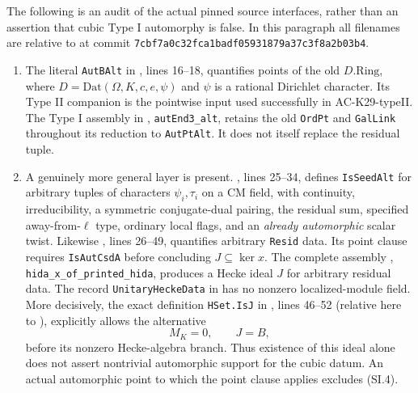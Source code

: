 \begin{remark}
\label{AC-K29-TypeI-source}
The following is an audit of the actual pinned source
interfaces, rather than an assertion that cubic Type I
automorphy is false.  In this paragraph all filenames are
relative to
at commit \texttt{7cbf7a0c32fca1badf05931879a37c3f8a2b03b4}.

\begin{enumerate}
\item The literal \texttt{AutBAlt} in
, lines 16--18,
quantifies points of the old $D.\mathrm{Ring}$, where
$D=\mathrm{Dat}(\Omega,K,c,e,\psi)$ and $\psi$ is a
rational Dirichlet character.  Its Type II companion is
the pointwise input used successfully in AC-K29-typeII.
The Type I assembly in ,
\texttt{autEnd3\_alt}, retains the old \texttt{OrdPt}
and \texttt{GalLink} throughout its reduction to
\texttt{AutPtAlt}.  It does not itself replace the residual
tuple.

\item A genuinely more general layer is present.
, lines 25--34, defines
\texttt{IsSeedAlt} for arbitrary tuples of characters
$\psi_i,\tau_i$ on a CM field, with continuity,
irreducibility, a symmetric conjugate-dual pairing,
the residual sum, specified away-from-$\ell$ type,
ordinary local flags, and an \emph{already automorphic}
scalar twist.  Likewise
, lines 26--49,
quantifies arbitrary \texttt{Resid} data.
Its point clause requires \texttt{IsAutCsdA} before
concluding $J\subseteq\ker x$.
The complete assembly
, \texttt{hida\_x\_of\_printed\_hida},
produces a Hecke ideal $J$ for arbitrary residual data.
The record \texttt{UnitaryHeckeData} in
 has no nonzero localized-module
field.  More decisively, the exact definition
\texttt{HSet.IsJ} in
, lines 46--52
(relative here to ), explicitly
allows the alternative
\[
          M_{K}=0,\qquad J=B,                             \tag{SI.4}
\]
before its nonzero Hecke-algebra branch.  Thus existence
of this ideal alone does not assert nontrivial automorphic
support for the cubic datum.  An actual automorphic point
to which the point clause applies excludes (SI.4).


\end{enumerate}
\end{remark}
